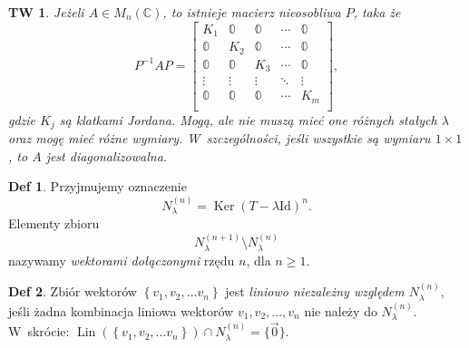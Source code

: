 \documentclass[a4paper, 12pt]{mwart}
\DeclareMathOperator{\Ker}{Ker}
\DeclareMathOperator{\Lin}{Lin}
\theoremstyle{definition}
\newtheorem{definicja}{Def}[section]
\theoremstyle{plain}
\newtheorem{twierdzenie}{TW}[section]
\theoremstyle{remark}
\begin{document}
\begin{twierdzenie}
	Jeżeli $A \in M_n(\mathbb{C})$, to istnieje macierz nieosobliwa $P$, taka że
	\begin{equation}
		P^{-1}AP = \begin{bmatrix}
			K_1 & \mathbb{0} & \mathbb{0} & \cdots & \mathbb{0} \\
			\mathbb{0} & K_2 & \mathbb{0} & \cdots & \mathbb{0} \\
			\mathbb{0} & \mathbb{0} & K_3 & \cdots & \mathbb{0} \\
			\vdots & \vdots & \vdots & \ddots & \vdots \\
			\mathbb{0} & \mathbb{0} & \mathbb{0} & \cdots & K_m \\
		\end{bmatrix},
	\end{equation}
	gdzie $K_j$ są klatkami Jordana. Mogą, ale nie muszą mieć one różnych stałych $\lambda$ oraz mogę mieć różne wymiary. W~szczególności, jeśli wszystkie są wymiaru $1\times 1$, to $A$ jest diagonalizowalna.
\end{twierdzenie}
\begin{definicja}
	Przyjmujemy oznaczenie
	\begin{equation}
		N_\lambda^{(n)} = \Ker{\left(T-\lambda\mathrm{Id}\right)}^n.
	\end{equation}
	Elementy zbioru
	\begin{equation}
		N_\lambda^{(n+1)} \setminus N_\lambda^{(n)}
	\end{equation}
	nazywamy \emph{wektorami dołączonymi} rzędu $n$, dla $n\geq 1$.
\end{definicja}
\begin{definicja}
	Zbiór wektorów $\left\{v_1, v_2, \ldots v_n\right\}$ jest \emph{liniowo niezależny względem $N_\lambda^{(n)}$}, jeśli żadna kombinacja liniowa wektorów $v_1, v_2, \ldots, v_n$ nie należy do $N_\lambda^{(n)}$. \\W~skrócie: $\Lin\left(\left\{v_1, v_2, \ldots v_n\right\}\right) \cap N_\lambda^{(n)} = \{\vec 0\}$.
\end{definicja}
\end{document}
